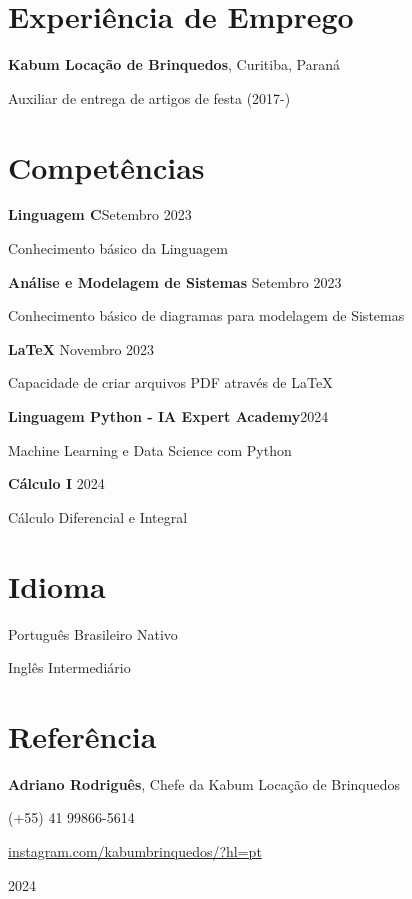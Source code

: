 \documentclass[12pt]{extarticle}
\newcommand{\cvsection}[1]{\section*{\rmfamily#1}}
\begin{document}
\cvsection{Experiência de Emprego}
\indent

{\large

\textbf{Kabum Locação de Brinquedos}, Curitiba, Paraná

\hspace{2em}Auxiliar de entrega de artigos de festa (2017-)

}

\newpage
\vspace*{.15cm}
\cvsection{Competências}
\noindent

{\large

\textbf{Linguagem C}\hfill Setembro 2023

\hspace{2em}Conhecimento básico da Linguagem

\textbf{Análise e Modelagem de Sistemas} \hfill Setembro 2023

\hspace{2em}Conhecimento básico de diagramas para modelagem de Sistemas

\textbf{LaTeX} \hfill Novembro 2023

\hspace{2em}Capacidade de criar arquivos PDF através de LaTeX

\textbf{Linguagem Python - IA Expert Academy}\hfill 2024

\hspace{2em}Machine Learning e Data Science com Python 

\textbf{Cálculo I} \hfill 2024

\hspace{2em}Cálculo Diferencial e Integral

}

\cvsection{Idioma}
\indent

{\large

Português Brasileiro Nativo

Inglês Intermediário

}


\cvsection{Referência}
\indent

{\large

\textbf{Adriano Rodriguês}, Chefe da Kabum Locação de Brinquedos

\hspace{2em}(+55) 41 99866-5614 

\hspace{2em}\url{instagram.com/kabumbrinquedos/?hl=pt}

}

\vfill
\begin{center}
    \Large 2024
\end{center}
\end{document}
